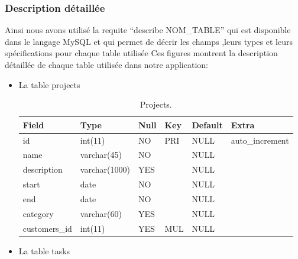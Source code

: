 \newpage

\subsubsection{Description d\'{e}taill\'{e}e}
\bigskip
Ainsi nous avons utilis\'{e} la requite \textquotedblleft{}describe NOM\_TABLE\textquotedblright{} qui est
disponible dans le langage MySQL et qui permet de d\'{e}crir les champs ,leurs
types et leurs sp\'{e}cifications pour chaque table utilis\'{e}e
Ces figures montrent la description d\'{e}taill\'{e}e de chaque table utilis\'{e}e dans
notre application:
\bigskip

\begin{itemize}


\item{La table \guillemotleft{} projects \guillemotright{}}


\begin{table}

\begin{tabular}{|l|l|l|l|l|l|}
\hline
Field         & Type          & Null & Key & Default & Extra            \\
\hline
id            & int(11)       & NO   & PRI & NULL    & auto\_increment  \\
\hline
name          & varchar(45)   & NO   &     & NULL    &                  \\
\hline
description   & varchar(1000) & YES  &     & NULL    &                  \\
\hline
start         & date          & NO   &     & NULL    &                  \\
\hline
end           & date          & NO   &     & NULL    &                  \\
\hline
category      & varchar(60)   & YES  &     & NULL    &                  \\
\hline
customers\_id & int(11)       & YES  & MUL & NULL    &                  \\
\hline
\end{tabular}
\centering
 \caption {Projects.}
\end{table}


\item{La table \guillemotleft{} tasks \guillemotright{}}

\begin{table}


\end{table}
\end{itemize}

